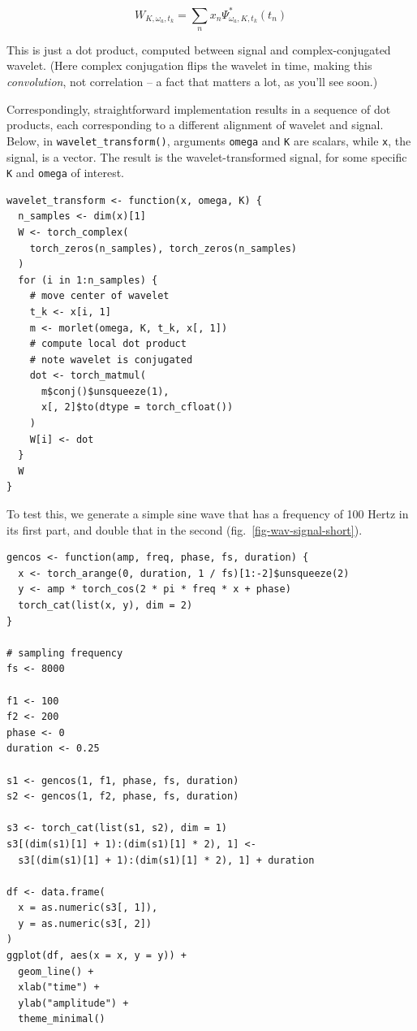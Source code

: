 \documentclass[
  letterpaper,
]{krantz}
\begin{document}
\[
W_{K, \omega_a, t_k} = \sum_n  x_n \Psi_{\omega_{a},K,t_{k}}^*(t_n)
\]

This is just a dot product, computed between signal and
complex-conjugated wavelet. (Here complex conjugation flips the wavelet
in time, making this \emph{convolution}, not correlation -- a fact that
matters a lot, as you'll see soon.)

Correspondingly, straightforward implementation results in a sequence of
dot products, each corresponding to a different alignment of wavelet and
signal. Below, in \texttt{wavelet\_transform()}, arguments
\texttt{omega} and \texttt{K} are scalars, while \texttt{x}, the signal,
is a vector. The result is the wavelet-transformed signal, for some
specific \texttt{K} and \texttt{omega} of interest.

\begin{verbatim}
wavelet_transform <- function(x, omega, K) {
  n_samples <- dim(x)[1]
  W <- torch_complex(
    torch_zeros(n_samples), torch_zeros(n_samples)
  )
  for (i in 1:n_samples) {
    # move center of wavelet
    t_k <- x[i, 1]
    m <- morlet(omega, K, t_k, x[, 1])
    # compute local dot product
    # note wavelet is conjugated
    dot <- torch_matmul(
      m$conj()$unsqueeze(1),
      x[, 2]$to(dtype = torch_cfloat())
    )
    W[i] <- dot
  }
  W
}
\end{verbatim}

To test this, we generate a simple sine wave that has a frequency of 100
Hertz in its first part, and double that in the second
(fig.~\ref{fig-wav-signal-short}).

\begin{verbatim}
gencos <- function(amp, freq, phase, fs, duration) {
  x <- torch_arange(0, duration, 1 / fs)[1:-2]$unsqueeze(2)
  y <- amp * torch_cos(2 * pi * freq * x + phase)
  torch_cat(list(x, y), dim = 2)
}

# sampling frequency
fs <- 8000

f1 <- 100
f2 <- 200
phase <- 0
duration <- 0.25

s1 <- gencos(1, f1, phase, fs, duration)
s2 <- gencos(1, f2, phase, fs, duration)

s3 <- torch_cat(list(s1, s2), dim = 1)
s3[(dim(s1)[1] + 1):(dim(s1)[1] * 2), 1] <-
  s3[(dim(s1)[1] + 1):(dim(s1)[1] * 2), 1] + duration

df <- data.frame(
  x = as.numeric(s3[, 1]),
  y = as.numeric(s3[, 2])
)
ggplot(df, aes(x = x, y = y)) +
  geom_line() +
  xlab("time") +
  ylab("amplitude") +
  theme_minimal()
\end{verbatim}
\end{document}
